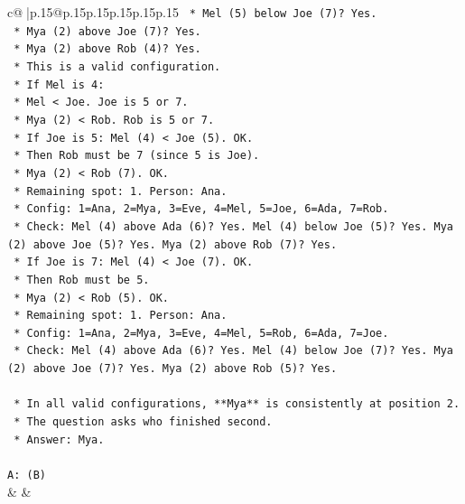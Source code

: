 \documentclass{article}
\begin{document}
{\begin{supertabular}{c@{$\;$}|p{.15\linewidth}@{}p{.15\linewidth}p{.15\linewidth}p{.15\linewidth}p{.15\linewidth}p{.15\linewidth}}
{{{\texttt{                *   Mel (5) below Joe (7)? Yes.} \\
\texttt{                *   Mya (2) above Joe (7)? Yes.} \\
\texttt{                *   Mya (2) above Rob (4)? Yes.} \\
\texttt{            *   This is a valid configuration.} \\
\texttt{        *   If Mel is 4:} \\
\texttt{            *   Mel < Joe. Joe is 5 or 7.} \\
\texttt{            *   Mya (2) < Rob. Rob is 5 or 7.} \\
\texttt{            *   If Joe is 5: Mel (4) < Joe (5). OK.} \\
\texttt{                *   Then Rob must be 7 (since 5 is Joe).} \\
\texttt{                *   Mya (2) < Rob (7). OK.} \\
\texttt{                *   Remaining spot: 1. Person: Ana.} \\
\texttt{                *   Config: 1=Ana, 2=Mya, 3=Eve, 4=Mel, 5=Joe, 6=Ada, 7=Rob.} \\
\texttt{                *   Check: Mel (4) above Ada (6)? Yes. Mel (4) below Joe (5)? Yes. Mya (2) above Joe (5)? Yes. Mya (2) above Rob (7)? Yes.} \\
\texttt{            *   If Joe is 7: Mel (4) < Joe (7). OK.} \\
\texttt{                *   Then Rob must be 5.} \\
\texttt{                *   Mya (2) < Rob (5). OK.} \\
\texttt{                *   Remaining spot: 1. Person: Ana.} \\
\texttt{                *   Config: 1=Ana, 2=Mya, 3=Eve, 4=Mel, 5=Rob, 6=Ada, 7=Joe.} \\
\texttt{                *   Check: Mel (4) above Ada (6)? Yes. Mel (4) below Joe (7)? Yes. Mya (2) above Joe (7)? Yes. Mya (2) above Rob (5)? Yes.} \\
\\ 
\texttt{    *   In all valid configurations, **Mya** is consistently at position 2.} \\
\texttt{    *   The question asks who finished second.} \\
\texttt{    *   Answer: Mya.} \\
\\ 
\texttt{A: (B)} \\
            }
        }
    }
    & & \\ \\


\end{supertabular}}
\end{document}
